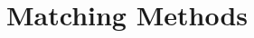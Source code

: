 \documentclass[conference]{IEEEtran}
\begin{document}
%
%
\section{Matching Methods}
\end{document}
